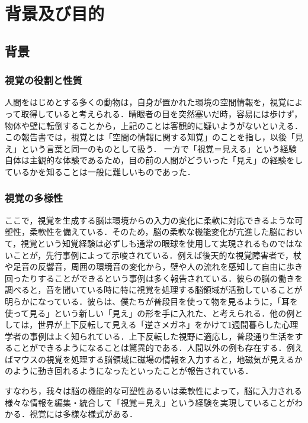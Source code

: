 \section{背景及び目的}
\subsection{背景}
\subsubsection{視覚の役割と性質}
人間をはじめとする多くの動物は，自身が置かれた環境の空間情報を，視覚によって取得していると考えられる．晴眼者の目を突然塞いだ時，容易には歩けず，物体や壁に転倒することから，上記のことは客観的に疑いようがないといえる．この報告書では，視覚とは「空間の情報に関する知覚」のことを指し，以後「見え」という言葉と同一のものとして扱う．
一方で「視覚＝見える」という経験自体は主観的な体験であるため，目の前の人間がどういった「見え」の経験をしているかを知ることは一般に難しいものであった．

\subsubsection{視覚の多様性}
ここで，視覚を生成する脳は環境からの入力の変化に柔軟に対応できるような可塑性，柔軟性を備えている．そのため，脳の柔軟な機能変化が亢進した脳において，視覚という知覚経験は必ずしも通常の眼球を使用して実現されるものではないことが，先行事例によって示唆されている．例えば後天的な視覚障害者で，杖や足音の反響音，周囲の環境音の変化から，壁や人の流れを感知して自由に歩き回ったりすることができるという事例は多く報告されている．彼らの脳の働きを調べると，音を聞いている時に特に視覚を処理する脳領域が活動していることが明らかになっている．彼らは、僕たちが普段目を使って物を見るように，「耳を使って見る」という新しい「見え」の形を手に入れた、と考えられる．他の例としては，世界が上下反転して見える「逆さメガネ」をかけて1週間暮らした心理学者の事例はよく知られている．上下反転した視野に適応し，普段通り生活をすることができるようになることは驚異的である．人間以外の例も存在する．例えばマウスの視覚を処理する脳領域に磁場の情報を入力すると，地磁気が見えるかのように動き回れるようになったといったことが報告されている．

すなわち，我々は脳の機能的な可塑性あるいは柔軟性によって，脳に入力される様々な情報を編集・統合して「視覚＝見え」という経験を実現していることがわかる．視覚には多様な様式がある．

